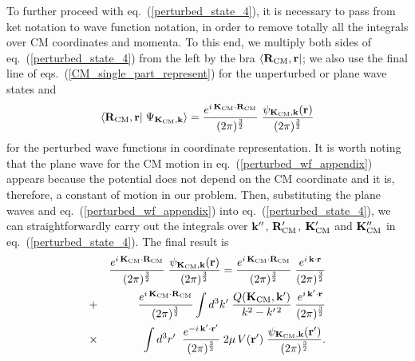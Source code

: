 \documentclass[aps,twocolumn,showpacs,preprintnumbers,amsmath,amssymb,nofootinbib,superscriptaddress,showkeys,noeprint]{revtex4-1}
\newcommand{\nk}{{\bf k}}
\newcommand{\nK}{{\bf K}}
\newcommand{\nr}{{\bf r}}
\newcommand{\nR}{{\bf R}}
\begin{document}
To further proceed with eq.~(\ref{perturbed_state_4}), it is necessary
to pass from ket notation to wave function notation, in order to
remove totally all the integrals over CM coordinates and momenta. To
this end, we multiply both sides of eq.~(\ref{perturbed_state_4}) from
the left by the bra $\left\langle \nR_{\rm CM},\nr \right|$; we also
use the final line of eqs.~(\ref{CM_single_part_represent}) for the
unperturbed or plane wave states and
\begin{equation}\label{perturbed_wf_appendix}
\left\langle \nR_{\rm CM},\nr \right|
\left. \Psi_{\nK_{\rm CM},\nk}\right\rangle = 
\frac{e^{i\, \nK_{\rm CM} \cdot \nR_{\rm CM}}}{(2\pi)^{\frac32}}\;
\frac{\psi_{\nK_{\rm CM},\nk}(\nr)}{(2\pi)^{\frac32}}
\end{equation}
for the perturbed wave functions in coordinate representation.  It is
worth noting that the plane wave for the CM motion in
eq.~(\ref{perturbed_wf_appendix}) appears because the potential does
not depend on the CM coordinate and it is, therefore, a constant of
motion in our problem. Then, substituting the plane waves and
eq.~(\ref{perturbed_wf_appendix}) into eq.~(\ref{perturbed_state_4}),
we can straightforwardly carry out the integrals over
$\nk^{\prime\prime}$, $\nR^{\prime}_{\rm CM}$, $\nK^\prime_{\rm CM}$
and $\nK^{\prime\prime}_{\rm CM}$ in
eq.~(\ref{perturbed_state_4}). The final result is
\begin{eqnarray}
&&\frac{e^{i\, \nK_{\rm CM} \cdot \nR_{\rm CM}}}{(2\pi)^{\frac32}}\;
\frac{\psi_{\nK_{\rm CM},\nk}(\nr)}{(2\pi)^{\frac32}}=
\frac{e^{i\, \nK_{\rm CM} \cdot \nR_{\rm CM}}}{(2\pi)^{\frac32}}\;
\frac{e^{i\, \nk \cdot \nr}}{(2\pi)^{\frac32}} \nonumber\\
&+&\frac{e^{i\, \nK_{\rm CM} \cdot \nR_{\rm CM}}}{(2\pi)^{\frac32}}
\int d^3k^\prime \; \frac{Q(\nK_{\rm CM},\nk^\prime)}{k^2-k^{\prime\,2}}\;
\frac{e^{i\, \nk^\prime \cdot \nr}}{(2\pi)^{\frac32}}\nonumber\\
&\times& \int d^3r^\prime \; \;
\frac{e^{-i\, \nk^\prime \cdot \nr^\prime}}{(2\pi)^{\frac32}}\;
2\mu\, V(\nr^\prime) \;
\frac{\psi_{\nK_{\rm CM},\nk}(\nr^\prime)}{(2\pi)^{\frac32}}.
\label{perturbed_state_5}
\end{eqnarray}
\end{document}
